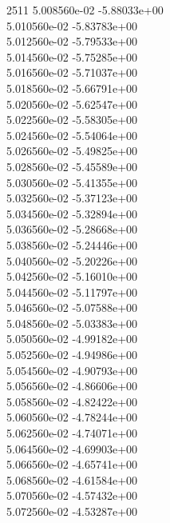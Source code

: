 2511	5.008560e-02	-5.88033e+00	\\ 	5.010560e-02	-5.83783e+00	\\ 	5.012560e-02	-5.79533e+00	\\ 	5.014560e-02	-5.75285e+00	\\ 	5.016560e-02	-5.71037e+00	\\ 	5.018560e-02	-5.66791e+00	\\ 	5.020560e-02	-5.62547e+00	\\ 	5.022560e-02	-5.58305e+00	\\ 	5.024560e-02	-5.54064e+00	\\ 	5.026560e-02	-5.49825e+00	\\ 	5.028560e-02	-5.45589e+00	\\ 	5.030560e-02	-5.41355e+00	\\ 	5.032560e-02	-5.37123e+00	\\ 	5.034560e-02	-5.32894e+00	\\ 	5.036560e-02	-5.28668e+00	\\ 	5.038560e-02	-5.24446e+00	\\ 	5.040560e-02	-5.20226e+00	\\ 	5.042560e-02	-5.16010e+00	\\ 	5.044560e-02	-5.11797e+00	\\ 	5.046560e-02	-5.07588e+00	\\ 	5.048560e-02	-5.03383e+00	\\ 	5.050560e-02	-4.99182e+00	\\ 	5.052560e-02	-4.94986e+00	\\ 	5.054560e-02	-4.90793e+00	\\ 	5.056560e-02	-4.86606e+00	\\ 	5.058560e-02	-4.82422e+00	\\ 	5.060560e-02	-4.78244e+00	\\ 	5.062560e-02	-4.74071e+00	\\ 	5.064560e-02	-4.69903e+00	\\ 	5.066560e-02	-4.65741e+00	\\ 	5.068560e-02	-4.61584e+00	\\ 	5.070560e-02	-4.57432e+00	\\ 	5.072560e-02	-4.53287e+00	\\ \hline
